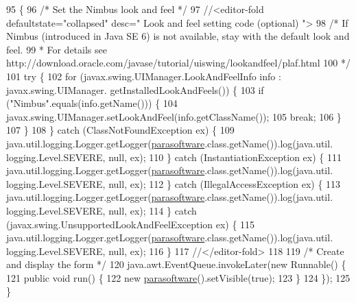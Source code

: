 \begin{DoxyCode}
95                                            \{
96         \textcolor{comment}{/* Set the Nimbus look and feel */}
97         \textcolor{comment}{//<editor-fold defaultstate="collapsed" desc=" Look and feel setting code (optional) ">}
98         \textcolor{comment}{/* If Nimbus (introduced in Java SE 6) is not available, stay with the default look and feel.}
99 \textcolor{comment}{         * For details see http://download.oracle.com/javase/tutorial/uiswing/lookandfeel/plaf.html }
100 \textcolor{comment}{         */}
101         \textcolor{keywordflow}{try} \{
102             \textcolor{keywordflow}{for} (javax.swing.UIManager.LookAndFeelInfo info : javax.swing.UIManager.
      getInstalledLookAndFeels()) \{
103                 \textcolor{keywordflow}{if} (\textcolor{stringliteral}{"Nimbus"}.equals(info.getName())) \{
104                     javax.swing.UIManager.setLookAndFeel(info.getClassName());
105                     \textcolor{keywordflow}{break};
106                 \}
107             \}
108         \} \textcolor{keywordflow}{catch} (ClassNotFoundException ex) \{
109             java.util.logging.Logger.getLogger(\mbox{\hyperlink{classsoftware_1_1parasoftware_aee631de1591fd8804c777c8beab9064e}{parasoftware}}.class.getName()).log(java.util.
      logging.Level.SEVERE, null, ex);
110         \} \textcolor{keywordflow}{catch} (InstantiationException ex) \{
111             java.util.logging.Logger.getLogger(\mbox{\hyperlink{classsoftware_1_1parasoftware_aee631de1591fd8804c777c8beab9064e}{parasoftware}}.class.getName()).log(java.util.
      logging.Level.SEVERE, null, ex);
112         \} \textcolor{keywordflow}{catch} (IllegalAccessException ex) \{
113             java.util.logging.Logger.getLogger(\mbox{\hyperlink{classsoftware_1_1parasoftware_aee631de1591fd8804c777c8beab9064e}{parasoftware}}.class.getName()).log(java.util.
      logging.Level.SEVERE, null, ex);
114         \} \textcolor{keywordflow}{catch} (javax.swing.UnsupportedLookAndFeelException ex) \{
115             java.util.logging.Logger.getLogger(\mbox{\hyperlink{classsoftware_1_1parasoftware_aee631de1591fd8804c777c8beab9064e}{parasoftware}}.class.getName()).log(java.util.
      logging.Level.SEVERE, null, ex);
116         \}
117         \textcolor{comment}{//</editor-fold>}
118 
119         \textcolor{comment}{/* Create and display the form */}
120         java.awt.EventQueue.invokeLater(\textcolor{keyword}{new} Runnable() \{
121             \textcolor{keyword}{public} \textcolor{keywordtype}{void} run() \{
122                 \textcolor{keyword}{new} \mbox{\hyperlink{classsoftware_1_1parasoftware_aee631de1591fd8804c777c8beab9064e}{parasoftware}}().setVisible(\textcolor{keyword}{true});
123             \}
124         \});
125     \}
\end{DoxyCode}


